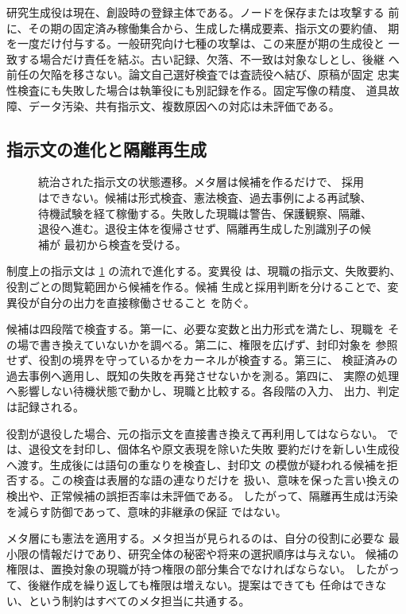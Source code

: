 研究生成役は現在、創設時の登録主体である。ノードを保存または攻撃する
前に、その期の固定済み稼働集合から、生成した構成要素、指示文の要約値、
期を一度だけ付与する。一般研究向け七種の攻撃は、この来歴が期の生成役と
一致する場合だけ責任を結ぶ。古い記録、欠落、不一致は対象なしとし、後継
へ前任の欠陥を移さない。論文自己選好検査では査読役へ結び、原稿が固定
忠実性検査にも失敗した場合は執筆役にも別記録を作る。固定写像の精度、
道具故障、データ汚染、共有指示文、複数原因への対応は未評価である。

\subsection{指示文の進化と隔離再生成}\label{sec:rqgm:prompts}

\begin{figure}[t]
  \centering
  \resizebox{\columnwidth}{!}{}
  \caption{統治された指示文の状態遷移。メタ層は候補を作るだけで、
    採用はできない。候補は形式検査、憲法検査、過去事例による再試験、
    待機試験を経て稼働する。失敗した現職は警告、保護観察、隔離、
    退役へ進む。退役主体を復帰させず、隔離再生成した別識別子の候補が
    最初から検査を受ける。}
  \label{fig:prompt-lifecycle}
\end{figure}

制度上の指示文は \cref{fig:prompt-lifecycle} の流れで進化する。変異役
は、現職の指示文、失敗要約、役割ごとの閲覧範囲から候補を作る。候補
生成と採用判断を分けることで、変異役が自分の出力を直接稼働させること
を防ぐ。

候補は四段階で検査する。第一に、必要な変数と出力形式を満たし、現職を
その場で書き換えていないかを調べる。第二に、権限を広げず、封印対象を
参照せず、役割の境界を守っているかをカーネルが検査する。第三に、
検証済みの過去事例へ適用し、既知の失敗を再発させないかを測る。第四に、
実際の処理へ影響しない待機状態で動かし、現職と比較する。各段階の入力、
出力、判定は記録される。

役割が退役した場合、元の指示文を直接書き換えて再利用してはならない。
では、退役文を封印し、個体名や原文表現を除いた失敗
要約だけを新しい生成役へ渡す。生成後には語句の重なりを検査し、封印文
の模倣が疑われる候補を拒否する。この検査は表層的な語の連なりだけを
扱い、意味を保った言い換えの検出や、正常候補の誤拒否率は未評価である。
したがって、隔離再生成は汚染を減らす防御であって、意味的非継承の保証
ではない。

メタ層にも憲法を適用する。メタ担当が見られるのは、自分の役割に必要な
最小限の情報だけであり、研究全体の秘密や将来の選択順序は与えない。
候補の権限は、置換対象の現職が持つ権限の部分集合でなければならない。
したがって、後継作成を繰り返しても権限は増えない。提案はできても
任命はできない、という制約はすべてのメタ担当に共通する。


